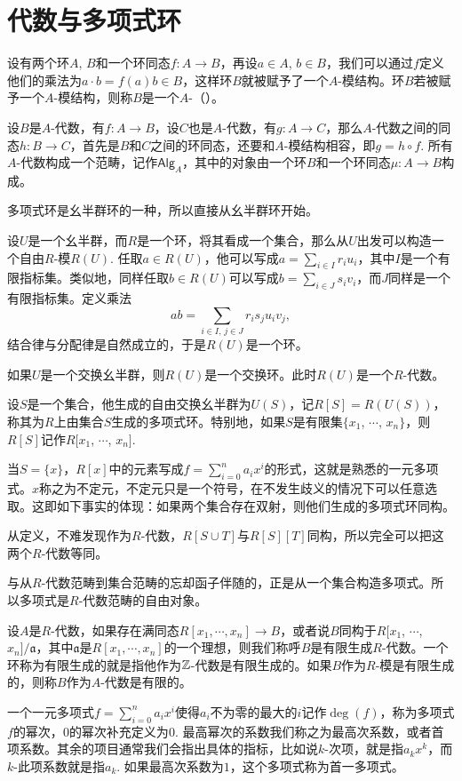 \section{代数与多项式环}

设有两个环$A$, $B$和一个环同态$f:A\to B$，再设$a\in A$, $b\in B$，我们可以通过$f$定义他们的乘法为$a\cdot b=f(a)b\in B$，这样环$B$就被赋予了一个$A$-模结构。环$B$若被赋予一个$A$-模结构，则称$B$是一个$A$-（）。

设$B$是$A$-代数，有$f:A\to B$，设$C$也是$A$-代数，有$g:A\to C$，那么$A$-代数之间的同态$h:B\to C$，首先是$B$和$C$之间的环同态，还要和$A$-模结构相容，即$g=h\circ f$. 所有$A$-代数构成一个范畴，记作$\mathsf{Alg}_A$，其中的对象由一个环$B$和一个环同态$\mu:A\to B$构成。

多项式环是幺半群环的一种，所以直接从幺半群环开始。

\para 设$U$是一个幺半群，而$R$是一个环，将其看成一个集合，那么从$U$出发可以构造一个自由$R$-模$R(U)$. 任取$a\in R(U)$，他可以写成$a=\sum_{i\in I} r_i u_i$，其中$I$是一个有限指标集。类似地，同样任取$b\in R(U)$可以写成$b=\sum_{i\in J} s_i v_i$，而$J$同样是一个有限指标集。定义乘法
\[
	ab=\sum_{i\in I,\, j\in J}r_is_j u_i v_j,
\]
结合律与分配律是自然成立的，于是$R(U)$是一个环。

如果$U$是一个交换幺半群，则$R(U)$是一个交换环。此时$R(U)$是一个$R$-代数。

\para 设$S$是一个集合，他生成的自由交换幺半群为$U(S)$，记$R[S]=R(U(S))$，称其为$R$上由集合$S$生成的多项式环。特别地，如果$S$是有限集$\{x_1$, $\cdots$, $x_n\}$，则$R[S]$记作$R[x_1$, $\cdots$, $x_n]$. 

当$S=\{x\}$，$R[x]$中的元素写成$f=\sum_{i=0}^na_ix^i$的形式，这就是熟悉的一元多项式。$x$称之为不定元，不定元只是一个符号，在不发生歧义的情况下可以任意选取。这即如下事实的体现：如果两个集合存在双射，则他们生成的多项式环同构。

从定义，不难发现作为$R$-代数，$R[S\cup T]$与$R[S][T]$同构，所以完全可以把这两个$R$-代数等同。

与从$R$-代数范畴到集合范畴的忘却函子伴随的，正是从一个集合构造多项式。所以多项式是$R$-代数范畴的自由对象。

\para 设$A$是$R$-代数，如果存在满同态$R[x_1,\cdots ,x_n]\to B$，或者说$B$同构于$R[x_1$, $\cdots$, $x_n]/\mathfrak{a}$，其中$\mathfrak{a}$是$R[x_1,\cdots ,x_n]$的一个理想，则我们称呼$B$是有限生成$R$-代数。一个环称为有限生成的就是指他作为$\mathbb{Z}$-代数是有限生成的。如果$B$作为$R$-模是有限生成的，则称$B$作为$A$-代数是有限的。

\para 一个一元多项式$f=\sum_{i=0}^na_ix^i$使得$a_i$不为零的最大的$i$记作$\deg(f)$，称为多项式$f$的幂次，$0$的幂次补充定义为$0$. 最高幂次的系数我们称之为最高次系数，或者首项系数。其余的项目通常我们会指出具体的指标，比如说$k$-次项，就是指$a_kx^k$，而$k$-此项系数就是指$a_k$. 如果最高次系数为$1$，这个多项式称为首一多项式。

